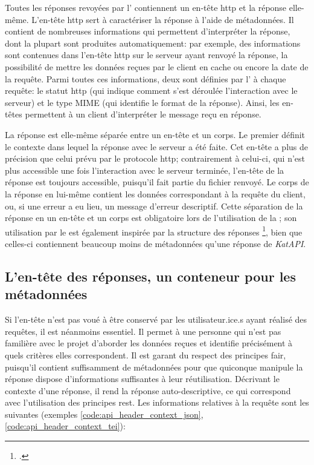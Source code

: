 Toutes les réponses revoyées par l'\api{} contiennent un en-tête \gls{http} et la réponse elle-même. L'en-tête \gls{http} sert à caractériser la réponse à l'aide de métadonnées. Il contient de nombreuses informations qui permettent d'interpréter la réponse, dont la plupart sont produites automatiquement: par exemple, des informations sont contenues dans l'en-tête \gls{http} sur le serveur ayant renvoyé la réponse, la possibilité de mettre les données reçues par le client en cache ou encore la date de la requête. Parmi toutes ces informations, deux sont définies par l'\api{} à chaque requête: le statut \gls{http} (qui indique comment s'est déroulée l'interaction avec le serveur) et le type MIME (qui identifie le format de la réponse). Ainsi, les en-têtes permettent à un client d'interpréter le message reçu en réponse.

La réponse est elle-même séparée entre un en-tête et un corps. Le premier définit le contexte dans lequel la réponse avec le serveur a été faite. Cet en-tête a plus de précision que celui prévu par le protocole \gls{http}; contrairement à celui-ci, qui n'est plus accessible une fois l'interaction avec le serveur terminée, l'en-tête de la réponse est toujours accessible, puisqu'il fait partie du fichier renvoyé. Le corps de la réponse en lui-même contient les données correspondant à la requête du client, ou, si une erreur a eu lieu, un message d'erreur descriptif. Cette séparation de la réponse en un en-tête et un corps est obligatoire lors de l'utilisation de la \tei{}; son utilisation par le \json{} est également inspirée par la structure des réponses \sparql{}\footcite{beckett_sparql_2013}, bien que celles-ci contiennent beaucoup moins de métadonnées qu'une réponse de \textit{KatAPI}.

\subsection{L'en-tête des réponses, un conteneur pour les métadonnées}
Si l'en-tête n'est pas voué à être conservé par les utilisateur.ice.s ayant réalisé des requêtes, il est néanmoins essentiel. Il permet à une personne qui n'est pas familière avec le projet d'aborder les données reçues et identifie précisément à quels critères elles correspondent. Il est garant du respect des principes \gls{fair}, puisqu'il contient suffisamment de métadonnées pour que quiconque manipule la réponse dispose d'informations suffisantes à leur réutilisation. Décrivant le contexte d'une réponse, il rend la réponse auto-descriptive, ce qui correspond avec l'utilisation des principes \gls{rest}. Les informations relatives à la requête sont les suivantes (exemples \ref{code:api_header_context_json}, \ref{code:api_header_context_tei}):

